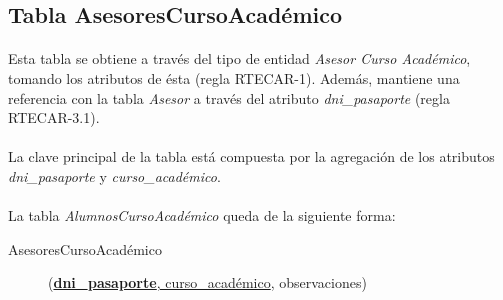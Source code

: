    \subsection{Tabla AsesoresCursoAcadémico}

      \paragraph{}Esta tabla se obtiene a través del tipo de entidad
      \textit{Asesor Curso Académico}, tomando los atributos de ésta (regla
      RTECAR-1). Además, mantiene una referencia con la tabla \textit{Asesor} a
      través del atributo \textit{dni\_pasaporte} (regla RTECAR-3.1).

      \paragraph{}La clave principal de la tabla está compuesta por la
      agregación de los atributos \textit{dni\_pasaporte} y
      \textit{curso\_académico}.

      \paragraph{}La tabla \textit{AlumnosCursoAcadémico} queda de la siguiente
      forma:

      \begin{description}
         \item[AsesoresCursoAcadémico] \begin{flushleft}(\underline{\textbf{dni\_pasaporte},
         curso\_académico}, observaciones)\end{flushleft}
      \end{description}
